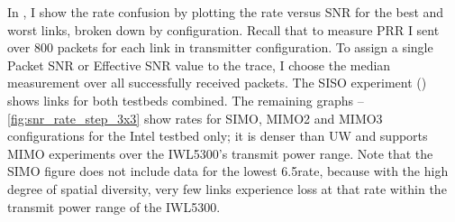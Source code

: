In , I show the rate confusion by plotting the rate versus SNR for the best and worst links, broken down by configuration. Recall that to measure PRR I sent over 800 packets for each link in transmitter configuration. To assign a single Packet SNR or Effective SNR value to the trace, I choose the median measurement over all successfully received packets. The SISO experiment () shows links for both testbeds combined. The remaining graphs --\ref{fig:snr_rate_step_3x3}  show rates for SIMO, MIMO2 and MIMO3 configurations for the Intel testbed only; it is denser than UW and supports MIMO experiments over the IWL5300's transmit power range. Note that the SIMO figure does not include data for the lowest 6.5\Mbps rate, because with the high degree of spatial diversity, very few links experience loss at that rate within the transmit power range of the IWL5300.


